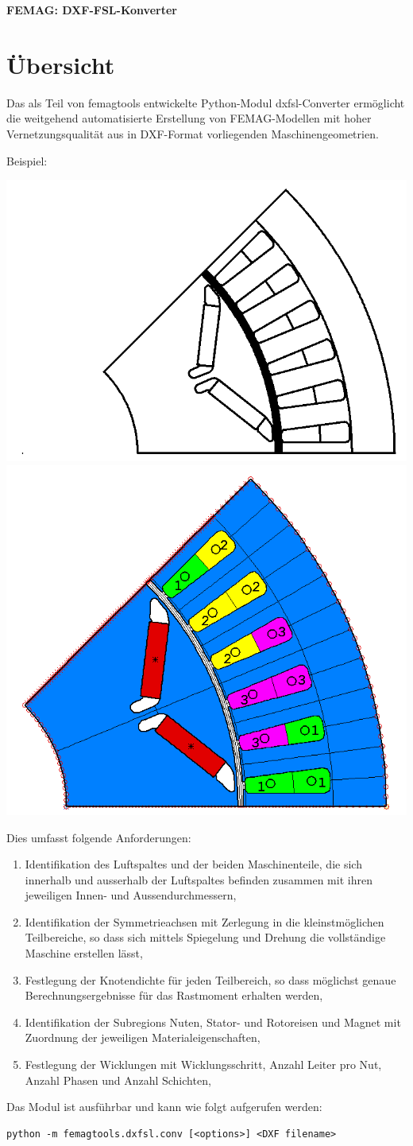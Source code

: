 \documentclass[10pt, a4paper,german]{scrartcl}
\begin{document}


\begin{center}
\LARGE\bfseries
FEMAG: DXF-FSL-Konverter
\end{center}
%
\section{Übersicht}
Das als Teil von femagtools entwickelte Python-Modul dxfsl-Converter ermöglicht die weitgehend
automatisierte Erstellung von FEMAG-Modellen mit hoher Vernetzungsqualität
aus in DXF-Format vorliegenden Maschinengeometrien.

Beispiel:

\includegraphics[width=0.47\linewidth]{dxf-orig} \hfill\includegraphics[width=0.4\linewidth]{femag-model}

Dies umfasst folgende Anforderungen:
\begin{enumerate}
\item Identifikation des Luftspaltes und der beiden Maschinenteile, die sich innerhalb und ausserhalb
  der Luftspaltes befinden zusammen mit ihren jeweiligen Innen- und Aussendurchmessern,
\item Identifikation der Symmetrieachsen mit Zerlegung in die kleinstmöglichen Teilbereiche, so dass
  sich mittels Spiegelung und Drehung die vollständige Maschine erstellen lässt,
\item Festlegung der Knotendichte für jeden Teilbereich, so dass möglichst genaue Berechnungsergebnisse
  für das Rastmoment erhalten werden,
\item Identifikation der Subregions Nuten, Stator- und Rotoreisen und Magnet mit Zuordnung der
  jeweiligen Materialeigenschaften,
\item Festlegung der Wicklungen mit Wicklungsschritt, Anzahl Leiter pro Nut, Anzahl Phasen und Anzahl Schichten,
\end{enumerate}
Das Modul ist ausführbar und kann wie folgt aufgerufen werden:
\begin{verbatim}
python -m femagtools.dxfsl.conv [<options>] <DXF filename>
\end{verbatim}
%
\newpage
\enlargethispage{1cm}
\end{document}
